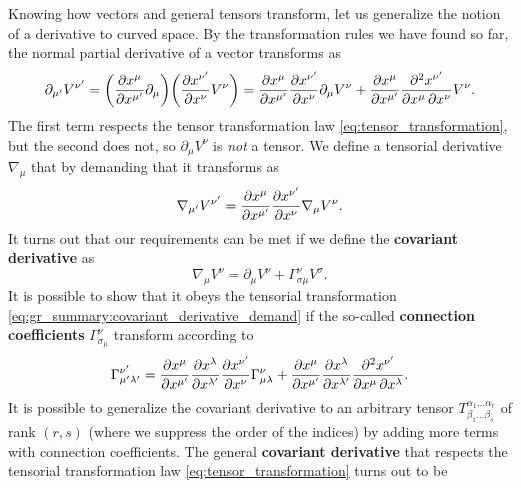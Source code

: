 Knowing how vectors and general tensors transform, let us generalize the notion of a derivative to curved space.
By the transformation rules we have found so far, the normal partial derivative of a vector transforms as
\begin{equation}
	\partial_{\mu'} V^{\nu'} = \bigg( \pdv{x^{\mu}}{x^{\mu'}} \partial_\mu \bigg) \bigg( \pdv{x^{\nu'}}{x^{\nu}} V^\nu \bigg)
	                         = \pdv{x^{\mu}}{x^{\mu'}} \pdv{x^{\nu'}}{x^{\nu}} \partial_\mu V^\nu + \pdv{x^{\mu}}{x^{\mu'}} \pdv{x^{\nu'}}{x^\mu, x^\nu} V^\nu .
\end{equation}
The first term respects the tensor transformation law \eqref{eq:tensor_transformation}, but the second does not, so $\partial_\mu V^\nu$ is \emph{not} a tensor.
We define a tensorial derivative $\nabla_\mu$ that by demanding that it transforms as
\begin{equation}
	\nabla_{\mu'} V^{\nu'} = \pdv{x^{\mu}}{x^{\mu'}} \pdv{x^{\nu'}}{x^{\nu}} \nabla_\mu V^\nu .
\label{eq:gr_summary:covariant_derivative_demand}
\end{equation}
It turns out that our requirements can be met if we define the \textbf{covariant derivative} as
\begin{equation}
	\nabla_\mu V^\nu = \partial_\mu V^\nu + \Gamma_{\sigma \mu}^\nu V^\sigma .
\end{equation}
It is possible to show that it obeys the tensorial transformation \eqref{eq:gr_summary:covariant_derivative_demand} if the so-called \textbf{connection coefficients} $\Gamma_{\sigma _\mu}^\nu$ transform according to \cite[equation 3.6-3.10]{ref:carroll} 
\begin{equation}
	\Gamma^{\nu'}_{\mu' \lambda'} = \pdv{x^{\mu}}{x^{\mu'}} \pdv{x^{\lambda}}{x^{\lambda'}} \pdv{x^{\nu'}}{x^{\nu}}  \Gamma^{\nu}_{\mu \lambda} + \pdv{x^{\mu}}{x^{\mu'}} \pdv{x^{\lambda}}{x^{\lambda'}} \pdv{x^{\nu'}}{x^\mu, x^\lambda} .
	\label{eq:connection_transformation}
\end{equation}
It is possible to generalize the covariant derivative to an arbitrary tensor $T^{\alpha_1 \ldots \alpha_r}_{\beta_1 \ldots \beta_s}$ of rank $(r,s)$ (where we suppress the order of the indices) by adding more terms with connection coefficients.
The general \textbf{covariant derivative} that respects the tensorial transformation law \eqref{eq:tensor_transformation} turns out to be \cite[equation 3.11-3.16]{ref:carroll}
